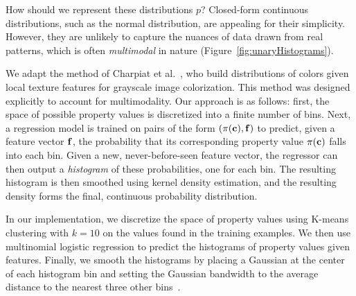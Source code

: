 How should we represent these distributions $p$? Closed-form continuous distributions, such as the normal distribution, are appealing for their simplicity.  However, they are unlikely to capture the nuances of data drawn from real patterns, which is often \emph{multimodal} in nature (Figure~\ref{fig:unaryHistograms}).

We adapt the method of Charpiat et al.~, who build distributions of colors given local texture features for grayscale image colorization. This method was designed explicitly to account for multimodality. Our approach is as follows: first, the space of possible property values is discretized into a finite number of bins. Next, a regression model is trained on pairs of the form $(\pi(\mathbf{c}), \mathbf{f})$ to predict, given a feature vector $\mathbf{f}$, the probability that its corresponding property value $\pi(\mathbf{c})$ falls into each bin. Given a new, never-before-seen feature vector, the regressor can then output a \emph{histogram} of these probabilities, one for each bin. The resulting histogram is then smoothed using kernel density estimation, and the resulting density forms the final, continuous probability distribution.

In our implementation, we discretize the space of property values using K-means clustering with $k = 10$ on the values found in the training examples. We then use multinomial logistic regression to predict the histograms of property values given features.
Finally, we smooth the histograms by placing a Gaussian at the center of each histogram bin and setting the Gaussian bandwidth to the average distance to the nearest three other bins~\cite{ThemeEnhancement}.



